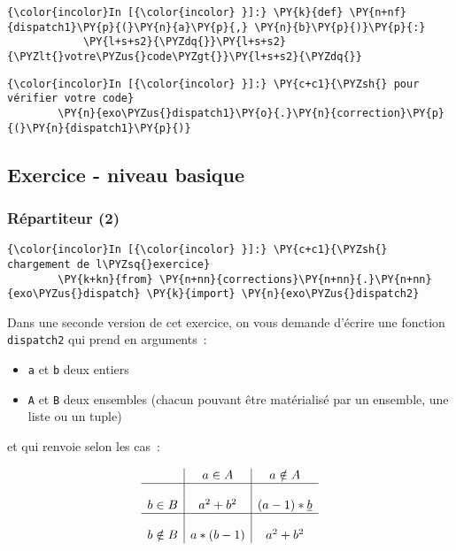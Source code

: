     \begin{Verbatim}[commandchars=\\\{\}]
{\color{incolor}In [{\color{incolor} }]:} \PY{k}{def} \PY{n+nf}{dispatch1}\PY{p}{(}\PY{n}{a}\PY{p}{,} \PY{n}{b}\PY{p}{)}\PY{p}{:}
            \PY{l+s+s2}{\PYZdq{}}\PY{l+s+s2}{\PYZlt{}votre\PYZus{}code\PYZgt{}}\PY{l+s+s2}{\PYZdq{}}
\end{Verbatim}


    \begin{Verbatim}[commandchars=\\\{\}]
{\color{incolor}In [{\color{incolor} }]:} \PY{c+c1}{\PYZsh{} pour vérifier votre code}
        \PY{n}{exo\PYZus{}dispatch1}\PY{o}{.}\PY{n}{correction}\PY{p}{(}\PY{n}{dispatch1}\PY{p}{)}
\end{Verbatim}


    \hypertarget{exercice---niveau-basique}{%
\subsection{Exercice - niveau basique}\label{exercice---niveau-basique}}

    \hypertarget{ruxe9partiteur-2}{%
\subsubsection{Répartiteur (2)}\label{ruxe9partiteur-2}}

    \begin{Verbatim}[commandchars=\\\{\}]
{\color{incolor}In [{\color{incolor} }]:} \PY{c+c1}{\PYZsh{} chargement de l\PYZsq{}exercice}
        \PY{k+kn}{from} \PY{n+nn}{corrections}\PY{n+nn}{.}\PY{n+nn}{exo\PYZus{}dispatch} \PY{k}{import} \PY{n}{exo\PYZus{}dispatch2}
\end{Verbatim}


    Dans une seconde version de cet exercice, on vous demande d'écrire une
fonction \texttt{dispatch2} qui prend en arguments~:

\begin{itemize}
	\item 
	\texttt{a} et \texttt{b} deux entiers
	\item
	\texttt{A} et \texttt{B} deux ensembles
	(chacun pouvant être matérialisé par un ensemble, une liste ou un tuple)
\end{itemize}

et qui renvoie selon les cas~:

\[\begin{array}{c|c|c} & a\in A & a\notin A\\
\hline
& & \\
b\in B & a\textsuperscript{2}+b\textsuperscript{2} & (a-1) * \emph{b}\\
\hline
& & \\
b\notin B & a * (b-1) & a\textsuperscript{2}+b\textsuperscript{2}
\end{array}
\]

